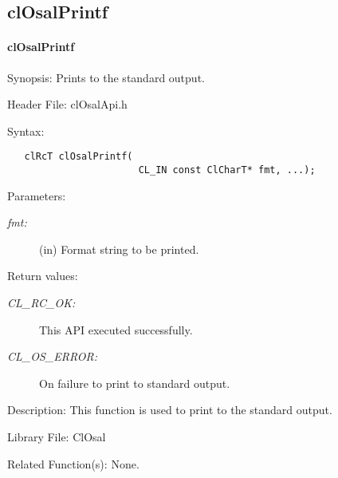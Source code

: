 \newpage
\subsection{clOsalPrintf}
\hypertarget{pageosal127}{}\paragraph{cl\-Osal\-Printf}\label{pageosal127}
\begin{Desc}
\item[Synopsis:]Prints to the standard output.\end{Desc}
\begin{Desc}
\item[Header File:]clOsalApi.h\end{Desc}
\begin{Desc}
\item[Syntax:]

\footnotesize\begin{verbatim}   clRcT clOsalPrintf(
                       CL_IN const ClCharT* fmt, ...);
\end{verbatim}
\normalsize
\end{Desc}
\begin{Desc}
\item[Parameters:]
\begin{description}
\item[{\em fmt:}](in) Format string to be printed.\end{description}
\end{Desc}
\begin{Desc}
\item[Return values:]
\begin{description}
\item[{\em CL\_\-RC\_\-OK:}]This API executed successfully. \item[{\em CL\_\-OS\_\-ERROR:}]On failure to print to standard output.\end{description}
\end{Desc}
\begin{Desc}
\item[Description:]This function is used to print to the standard output.\end{Desc}
\begin{Desc}
\item[Library File:]Cl\-Osal\end{Desc}
\begin{Desc}
\item[Related Function(s):]None. \end{Desc}




